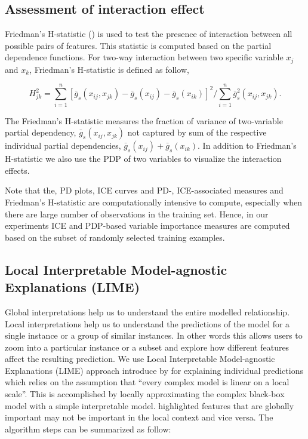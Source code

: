 \documentclass[11pt,a4paper,]{article}
\begin{document}
\subsection{Assessment of interaction
effect}\label{assessment-of-interaction-effect}

Friedman's H-statistic (\textcite{friedman2008predictive}) is used to
test the presence of interaction between all possible pairs of features.
This statistic is computed based on the partial dependence functions.
For two-way interaction between two specific variable \(x_j\) and
\(x_k\), Friedman's H-statistic is defined as follow,

\[H_{jk}^2=\sum_{i=1}^{n}[\bar{g}_{s}(x_{ij}, x_{jk})-\bar{g}_{s}(x_{ij})-\bar{g}_{s}(x_{ik})]^2/\sum_{i=1}^{n}\bar{g}^2_{s}(x_{ij}, x_{jk}).\]

The Friedman's H-statistic measures the fraction of variance of
two-variable partial dependency, \(\bar{g}_{s}(x_{ij}, x_{jk})\) not
captured by sum of the respective individual partial dependencies,
\(\bar{g}_{s}(x_{ij})+\bar{g}_{s}(x_{ik})\). In addition to Friedman's
H-statistic we also use the PDP of two variables to visualize the
interaction effects.

Note that the, PD plots, ICE curves and PD-, ICE-associated measures and
Friedman's H-statistic are computationally intensive to compute,
especially when there are large number of observations in the training
set. Hence, in our experiments ICE and PDP-based variable importance
measures are computed based on the subset of randomly selected training
examples.

\subsection{Local Interpretable Model-agnostic Explanations
(LIME)}\label{local-interpretable-model-agnostic-explanations-lime}

Global interpretations help us to understand the entire modelled
relationship. Local interpretations help us to understand the
predictions of the model for a single instance or a group of similar
instances. In other words this allows users to zoom into a particular
instance or a subset and explore how different features affect the
resulting prediction. We use Local Interpretable Model-agnostic
Explanations (LIME) approach introduce by \textcite{ribeiro2016should}
for explaining individual predictions which relies on the assumption
that ``every complex model is linear on a local scale''. This is
accomplished by locally approximating the complex black-box model with a
simple interpretable model. \textcite{ribeiro2016should} highlighted
features that are globally important may not be important in the local
context and vice versa. The algorithm steps can be summarized as follow:
\end{document}

